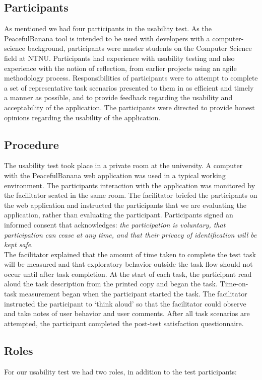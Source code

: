 \subsection{Participants}
As mentioned we had four participants in the usability test. As the PeacefulBanana tool is intended to be used with developers with a computer-science background, participants were master students on the Computer Science field at NTNU. Participants had experience with usability testing and also experience with the notion of reflection, from earlier projects using an agile methodology process.
Responsibilities of participants were to attempt to complete a set of representative task scenarios presented to them in as efficient and timely a manner as possible, and to provide feedback regarding the usability and acceptability of the application. The participants were directed to provide honest opinions regarding the usability of the application.

\subsection{Procedure}
The usability test took place in a private room at the university. A computer with the PeacefulBanana web application was used in a typical working environment. The participants interaction with the application was monitored by the facilitator seated in the same room.
The facilitator briefed the participants on the web application and instructed the participants that we are evaluating the application, rather than evaluating the participant. Participants signed an informed consent that acknowledges: \emph{the participation is voluntary, that participation can cease at any time, and that their privacy of identification will be kept safe}. \\
The facilitator explained that the amount of time taken to complete the test task will be measured and that exploratory behavior outside the task flow should not occur until after task completion. At the start of each task, the participant read aloud the task description from the printed copy and began the task. Time-on-task measurement began when the participant started the task.
The facilitator instructed the participant to ‘think aloud’ so that the facilitator could observe and take notes of user behavior and user comments.
After all task scenarios are attempted, the participant completed the post-test satisfaction questionnaire.

\subsection{Roles}
For our usability test we had two roles, in addition to the test participants:
